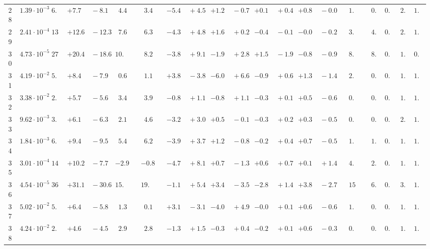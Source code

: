 \documentclass[12pt]{article}
\begin{document}
\begin{table}
\begin{tabular}{ccrr@{\hskip0pt}rrc@{\hskip0pt}r@{\hskip0pt}c@{\hskip0pt}r@{\hskip0pt}rr@{\hskip0pt}rr@{\hskip0pt}rr@{\hskip0pt}rr@{\hskip0pt}r@{\hskip0pt}r@{\hskip0pt}c|rr|r}
28 &$1.39 \cdot 10^{-3}$ &$ 6.5$  & ${+7.7~}$&${~-8.1}$ & $ 4.4$  & &$ 3.4$&&${-5.4~}$&${~+4.5}$ & ${+1.2~}$&${~-0.7}$ & ${+0.1~}$&${~+0.4}$ & ${+0.8~}$&${~-0.0}$ & &$ 1.6$&&$ 0.9$  & $0.96$  & $ 2.0$  & $1.03$   \\ 
29 &$2.41 \cdot 10^{-4}$ &$13.5$  & ${+12.6~}$&${~-12.3}$ & $ 7.6$  & &$ 6.3$&&${-4.3~}$&${~+4.8}$ & ${+1.6~}$&${~+0.2}$ & ${-0.4~}$&${~-0.1}$ & ${-0.0~}$&${~-0.2}$ & &$ 3.8$&&$ 4.3$  & $0.95$  & $ 2.5$  & $1.03$   \\ 
30 &$4.73 \cdot 10^{-5}$ &$27.8$  & ${+20.4~}$&${~-18.6}$ & $10.1$  & &$ 8.2$&&${-3.8~}$&${~+9.1}$ & ${-1.9~}$&${~+2.8}$ & ${+1.5~}$&${~-1.9}$ & ${-0.8~}$&${~-0.9}$ & &$ 8.8$&&$ 8.3$  & $0.95$  & $ 1.1$  & $0.96$   \\ 
31 &$4.19 \cdot 10^{-2}$ &$ 5.4$  & ${+8.4~}$&${~-7.9}$ & $ 0.6$  & &$ 1.1$&&${+3.8~}$&${~-3.8}$ & ${-6.0~}$&${~+6.6}$ & ${-0.9~}$&${~+0.6}$ & ${+1.3~}$&${~-1.4}$ & &$ 2.4$&&$ 0.5$  & $0.90$  & $ 1.5$  & $1.03$   \\ 
32 &$3.38 \cdot 10^{-2}$ &$ 2.7$  & ${+5.7~}$&${~-5.6}$ & $ 3.4$  & &$ 3.9$&&${-0.8~}$&${~+1.1}$ & ${-0.8~}$&${~+1.1}$ & ${-0.3~}$&${~+0.1}$ & ${+0.5~}$&${~-0.6}$ & &$ 0.9$&&$ 0.2$  & $0.94$  & $ 1.8$  & $1.03$   \\ 
33 &$9.62 \cdot 10^{-3}$ &$ 3.1$  & ${+6.1~}$&${~-6.3}$ & $ 2.1$  & &$ 4.6$&&${-3.2~}$&${~+3.0}$ & ${+0.5~}$&${~-0.1}$ & ${-0.3~}$&${~+0.2}$ & ${+0.3~}$&${~-0.5}$ & &$ 0.7$&&$ 0.4$  & $0.95$  & $ 2.0$  & $1.03$   \\ 
34 &$1.84 \cdot 10^{-3}$ &$ 6.2$  & ${+9.4~}$&${~-9.5}$ & $ 5.4$  & &$ 6.2$&&${-3.9~}$&${~+3.7}$ & ${+1.2~}$&${~-0.8}$ & ${-0.2~}$&${~+0.4}$ & ${+0.7~}$&${~-0.5}$ & &$ 1.5$&&$ 1.0$  & $0.96$  & $ 1.6$  & $1.03$   \\ 
35 &$3.01 \cdot 10^{-4}$ &$14.4$  & ${+10.2~}$&${~-7.7}$ & $-2.9$  & &$-0.8$&&${-4.7~}$&${~+8.1}$ & ${+0.7~}$&${~-1.3}$ & ${+0.6~}$&${~+0.7}$ & ${+0.1~}$&${~+1.4}$ & &$ 4.4$&&$ 2.3$  & $0.96$  & $ 1.8$  & $1.03$   \\ 
36 &$4.54 \cdot 10^{-5}$ &$36.0$  & ${+31.1~}$&${~-30.6}$ & $15.4$  & &$19.7$&&${-1.1~}$&${~+5.4}$ & ${+3.4~}$&${~-3.5}$ & ${-2.8~}$&${~+1.4}$ & ${+3.8~}$&${~-2.7}$ & &$15.5$&&$ 6.7$  & $0.96$  & $ 3.0$  & $1.04$   \\ 
37 &$5.02 \cdot 10^{-2}$ &$ 5.2$  & ${+6.4~}$&${~-5.8}$ & $ 1.3$  & &$ 0.1$&&${+3.1~}$&${~-3.1}$ & ${-4.0~}$&${~+4.9}$ & ${-0.0~}$&${~+0.1}$ & ${+0.6~}$&${~-0.6}$ & &$ 1.8$&&$ 0.5$  & $0.90$  & $ 1.0$  & $1.04$   \\ 
38 &$4.24 \cdot 10^{-2}$ &$ 2.5$  & ${+4.6~}$&${~-4.5}$ & $ 2.9$  & &$ 2.8$&&${-1.3~}$&${~+1.5}$ & ${-0.3~}$&${~+0.4}$ & ${-0.2~}$&${~+0.1}$ & ${+0.6~}$&${~-0.3}$ & &$ 0.7$&&$ 0.3$  & $0.94$  & $ 1.3$  & $1.03$   \\ 

\end{tabular}
\end{table}
\end{document}
